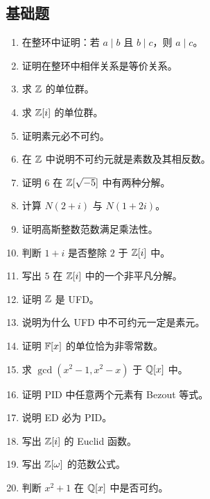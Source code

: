 \subsection*{基础题}
\begin{enumerate}[label=\textbf{\arabic*.}, leftmargin=*, itemsep=0.5em]
\item \basic 在整环中证明：若 $a\mid b$ 且 $b\mid c$，则 $a\mid c$。
\item \basic 证明在整环中相伴关系是等价关系。
\item \basic 求 $\mathbb{Z}$ 的单位群。
\item \basic 求 $\mathbb{Z}[i]$ 的单位群。
\item \basic 证明素元必不可约。
\item \basic 在 $\mathbb{Z}$ 中说明不可约元就是素数及其相反数。
\item \basic 证明 $6$ 在 $\mathbb{Z}[\sqrt{-5}]$ 中有两种分解。
\item \basic 计算 $N(2+i)$ 与 $N(1+2i)$。
\item \basic 证明高斯整数范数满足乘法性。
\item \basic 判断 $1+i$ 是否整除 $2$ 于 $\mathbb{Z}[i]$ 中。
\item \basic 写出 $5$ 在 $\mathbb{Z}[i]$ 中的一个非平凡分解。
\item \basic 证明 $\mathbb{Z}$ 是 UFD。
\item \basic 说明为什么 UFD 中不可约元一定是素元。
\item \basic 证明 $\mathbb{F}[x]$ 的单位恰为非零常数。
\item \basic 求 $\gcd(x^2-1,x^2-x)$ 于 $\mathbb{Q}[x]$ 中。
\item \basic 证明 PID 中任意两个元素有 Bezout 等式。
\item \basic 说明 ED 必为 PID。
\item \basic 写出 $\mathbb{Z}[i]$ 的 Euclid 函数。
\item \basic 写出 $\mathbb{Z}[\omega]$ 的范数公式。
\item \basic 判断 $x^2+1$ 在 $\mathbb{Q}[x]$ 中是否可约。
\end{enumerate}

